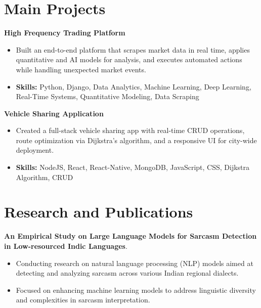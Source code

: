 \documentclass[a4paper,11pt]{article}
\begin{document}
\section{\textbf{Main Projects}}

\vspace{1mm}
  \textbf{High Frequency Trading Platform  }
\vspace{-1.5mm} %
\begin{itemize}
  \item Built an end-to-end platform that scrapes market data in real time, applies quantitative and AI models for analysis, and executes automated actions while handling unexpected market events.
\vspace{-3mm}
  \item \textbf{Skills:} Python, Django, Data Analytics, Machine Learning, Deep Learning, Real-Time Systems, Quantitative Modeling, Data Scraping
\end{itemize}


\vspace{1mm}
   \textbf{Vehicle Sharing Application }
\vspace{-1.5mm} %
\begin{itemize}
  \item Created a full-stack vehicle sharing app with real-time CRUD operations, route optimization via Dijkstra's algorithm, and a responsive UI for city-wide deployment.
\vspace{-3mm}
  \item \textbf{Skills:} NodeJS, React, React-Native, MongoDB, JavaScript, CSS, Dijkstra Algorithm, CRUD
\end{itemize}



\section{\textbf{Research and Publications} \hfill }
\vspace{1mm}
  \textbf{An Empirical Study on Large Language Models for Sarcasm Detection in Low-resourced Indic Languages}.
\vspace{-1mm} %
\begin{itemize}
  \item Conducting research on natural language processing (NLP) models aimed at detecting and analyzing sarcasm across various Indian regional dialects.
\vspace{-3mm}
  \item Focused on enhancing machine learning models to address linguistic diversity and complexities in sarcasm interpretation.
\end{itemize}
\end{document}
